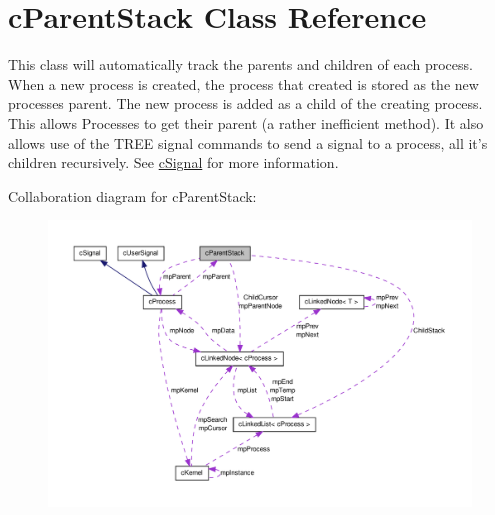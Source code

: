 \hypertarget{classc_parent_stack}{
\section{cParentStack Class Reference}
\label{classc_parent_stack}
}


This class will automatically track the parents and children of each process. When a new process is created, the process that created is stored as the new processes parent. The new process is added as a child of the creating process. This allows Processes to get their parent (a rather inefficient method). It also allows use of the TREE signal commands to send a signal to a process, all it's children recursively. See \hyperlink{classc_signal}{cSignal} for more information.  




Collaboration diagram for cParentStack:\nopagebreak
\begin{figure}[H]
\begin{center}
\leavevmode
\includegraphics[width=400pt]{classc_parent_stack__coll__graph}
\end{center}
\end{figure}

